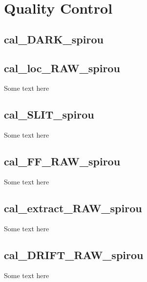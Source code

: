  \chapter{Quality Control}


\section{cal\_DARK\_spirou}
\label{section:qc_cal_DARK_spirou}


\section{cal\_loc\_RAW\_spirou}
\label{section:qc_cal_loc_RAW_spirou}

Some text here

\section{cal\_SLIT\_spirou}
\label{section:qc_cal_SLIT_spirou}

Some text here

\section{cal\_FF\_RAW\_spirou}
\label{section:qc_cal_FF_RAW_spirou}

Some text here

\section{cal\_extract\_RAW\_spirou}
\label{section:qc_cal_extract_RAW_spirou}

Some text here

\section{cal\_DRIFT\_RAW\_spirou}
\label{section:qc_cal_DRIFT_RAW_spirou}

Some text here